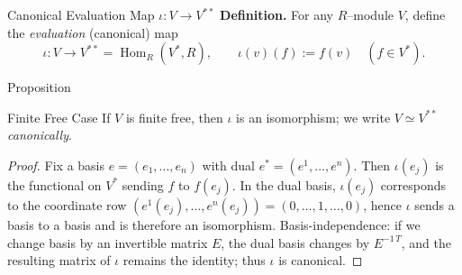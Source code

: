 \begin{frame}{Canonical Evaluation Map $\iota:V\to V^{**}$}
\textbf{Definition.} For any $R$–module $V$, define the \emph{evaluation} (canonical) map
\[
\iota:V\longrightarrow V^{**}=\operatorname{Hom}_R(V^*,R),\qquad
\iota(v)(f):=f(v)\quad (f\in V^*).
\]

\begin{center}
\end{center}

\end{frame}

\begin{frame}{Proposition}

\begin{block}{Finite Free Case} If $V$ is finite free, then $\iota$ is an isomorphism; we write $V \simeq V^{**}$ \emph{canonically}.

\end{block}

\begin{proof}
Fix a basis $e=(e_1,\dots,e_n)$ with dual $e^*=(e^1,\dots,e^n)$. Then $\iota(e_j)$ is the functional on $V^*$ sending $f$ to $f(e_j)$. In the dual basis, $\iota(e_j)$ corresponds to the coordinate row $(e^1(e_j),\dots,e^n(e_j))=(0,\dots,1,\dots,0)$, hence $\iota$ sends a basis to a basis and is therefore an isomorphism. Basis-independence: if we change basis by an invertible matrix $E$, the dual basis changes by $E^{-1\,T}$, and the resulting matrix of $\iota$ remains the identity; thus $\iota$ is canonical.
\end{proof}
\end{frame}

